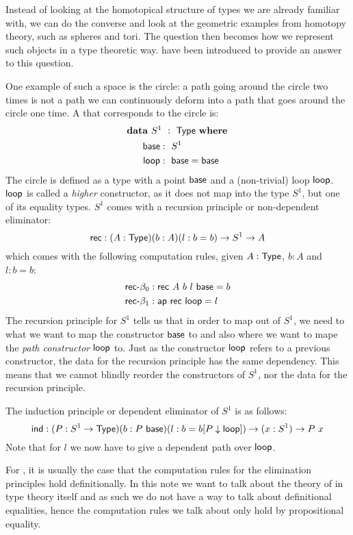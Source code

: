 \documentclass[a4paper,10pt]{report}
\begin{document}
Instead of looking at the homotopical structure of types we are
already familiar with, we can do the converse and look at the
geometric examples from homotopy theory, such as spheres and tori. The
question then becomes how we represent such objects in a type
theoretic way. \Hits have been introduced to provide an answer to this
question.

One example of such a space is the circle: a path going around the
circle two times is not a path we can continuously deform into a path
that goes around the circle one time. A \hit that corresponds to the
circle is:
%
\begin{alignat*}{2}
  &\rlap{$\data\ S^1\ :\ \Type\ \where$} \\
  &&\ \ \base     &:\ S^1 \\
  &&\ \ \loopcstr &:\ \base = \base
\end{alignat*}
%
The circle is defined as a type with a point $\mathsf{base}$ and a
(non-trivial) loop $\mathsf{loop}$. $\mathsf{loop}$ is called a \emph{higher}
constructor, as it does not map into the type $S^1$, but one of its
equality types. $S^1$ comes with a recursion principle or
non-dependent eliminator:
$$
\mathsf{rec} : (A : \mathsf{Type}) (b : A) (l : b = b) \to S^1 \to A
$$
which comes with the following computation rules, given $A : \mathsf{Type}$,
$b : A$ and $l : b = b$:
%
\begin{align*}
&\mathsf{rec}\mbox{-}\beta_0 : \mathsf{rec}\ A\ b\ l\ \mathsf{base} = b \\
&\mathsf{rec}\mbox{-}\beta_1 : \mathsf{ap}\ \mathsf{rec}\ \mathsf{loop} = l
\end{align*}
%
The recursion principle for $S^1$ tells us that in order to map out of
$S^1$, we need to what we want to map the constructor $\mathsf{base}$ to and
also where we want to mape the \emph{path constructor} $\mathsf{loop}$
to. Just as the constructor $\mathsf{loop}$ refers to a previous
constructor, the data for the recursion principle has the same
dependency. This means that we cannot blindly reorder the constructors
of $S^1$, nor the data for the recursion principle.

The induction principle or dependent eliminator of $S^1$ is as
follows:
$$
\mathsf{ind} : (P : S^1 \to \mathsf{Type}) (b : P\ \mathsf{base}) (l : b = b [ P \downarrow \mathsf{loop} ]) \to (x : S^1) \to P\ x
$$
Note that for $l$ we now have to give a dependent path over
$\mathsf{loop}$.

For \oits, it is usually the case that the computation rules for the
elimination principles hold definitionally. In this note we want to
talk about the theory of \hits in type theory itself and as such we do
not have a way to talk about definitional equalities, hence the
computation rules we talk about only hold by propositional equality.
\end{document}
